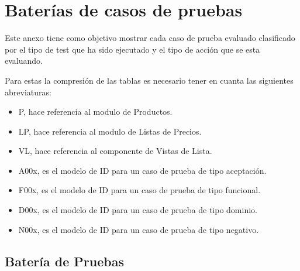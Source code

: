 \chapter{Baterías de casos de pruebas}
Este anexo tiene como objetivo mostrar cada caso de prueba evaluado clasificado
por el tipo de test que ha sido ejecutado y el tipo de acción que se esta
evaluando.

Para estas la compresión de las tablas es necesario tener en cuanta las
siguientes abreviaturas:

\begin{itemize}
    \item P, hace referencia al modulo de Productos.
    \item LP, hace referencia al modulo de Listas de Precios.
    \item VL, hace referencia al componente de Vistas de Lista.
    \item A00x, es el modelo de ID para un caso de prueba de tipo aceptación.
    \item F00x, es el modelo de ID para un caso de prueba de tipo funcional.
    \item D00x, es el modelo de ID para un caso de prueba de tipo dominio.
    \item N00x, es el modelo de ID para un caso de prueba de tipo negativo.
\end{itemize}

\section{Batería de Pruebas}

